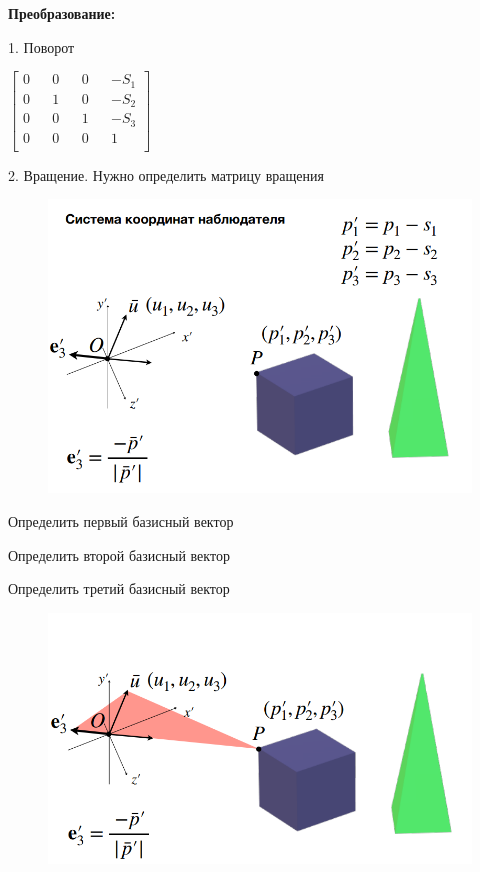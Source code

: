 \documentclass{article}
\begin{document}
\vspace{5mm}

\textbf{Преобразование:}

\vspace{2mm}
1. Поворот

$\begin{bmatrix}
    0 && 0 && 0 && -S_1 \\
    0 && 1 && 0 && -S_2 \\
    0 && 0 && 1 && -S_3 \\
    0 && 0 && 0 && 1 \\
\end{bmatrix}
$

\vspace{5mm}

2. Вращение. Нужно определить матрицу вращения

\begin{figure} [H]
    \includegraphics[width=0.70\linewidth]{Снимок экрана 2025-03-31 130326.png}
\end{figure}

Определить первый базисный вектор

Определить второй базисный вектор

Определить третий базисный вектор

\begin{figure} [H]
    \includegraphics[width=0.70\linewidth]{Снимок экрана 2025-03-31 130527.png}
\end{figure}
\end{document}
